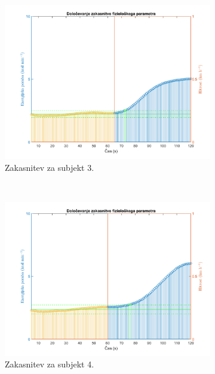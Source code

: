 \begin{figure}[!htbp]
\begin{subfigure}[t]{0.45\columnwidth}
		\includegraphics[width=\columnwidth]{./Slike/lag-estimation-3-eem.png}
		\caption{Zakasnitev za subjekt 3.}
		\label{fig:lag-estimation-3-eem}
	\end{subfigure}
	~
	\begin{subfigure}[t]{0.45\columnwidth}
		\includegraphics[width=\columnwidth]{./Slike/lag-estimation-4-eem.png}
		\caption{Zakasnitev za subjekt 4.}
		\label{fig:lag-estimation-4-eem}
	\end{subfigure}
	~
	\begin{subfigure}[t]{0.45\columnwidth}

\end{subfigure}
\end{figure}
